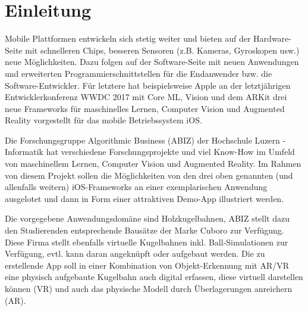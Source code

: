 \section{Einleitung}

Mobile Plattformen entwickeln sich stetig weiter und bieten auf der Hardware-Seite mit schnelleren Chips, besseren Sensoren (z.B. Kameras, Gyroskopen usw.) neue Möglichkeiten. Dazu folgen auf der Software-Seite mit neuen Anwendungen und erweiterten Programmierschnittstellen für die Endanwender bzw. die Software-Entwickler. Für letztere hat beispielsweise Apple an der letztjährigen Entwicklerkonferenz WWDC 2017 mit Core ML, Vision und dem ARKit drei neue Frameworks für maschinelles Lernen, Computer Vision und Augmented Reality vorgestellt für das mobile Betriebssystem iOS.


Die Forschungsgruppe Algorithmic Business (ABIZ) der Hochschule Luzern - Informatik hat verschiedene Forschungsprojekte und viel Know-How im Umfeld von maschinellem Lernen, Computer Vision und Augmented Reality. Im Rahmen von diesem Projekt sollen die Möglichkeiten von den drei oben genannten (und allenfalls weitern) iOS-Frameworks an einer exemplarischen Anwendung ausgelotet und dann in Form einer attraktiven Demo-App illustriert werden.


Die vorgegebene Anwendungsdomäne sind Holzkugelbahnen, ABIZ stellt dazu den Studierenden entsprechende Bausätze der Marke Cuboro zur Verfügung. Diese Firma stellt ebenfalls virtuelle Kugelbahnen inkl. Ball-Simulationen zur Verfügung, evtl. kann daran angeknüpft oder aufgebaut werden. Die zu erstellende App soll in einer Kombination von Objekt-Erkennung mit AR/VR eine physisch aufgebaute Kugelbahn auch digital erfassen, diese virtuell darstellen können (VR) und auch das physische Modell durch Überlagerungen anreichern (AR).